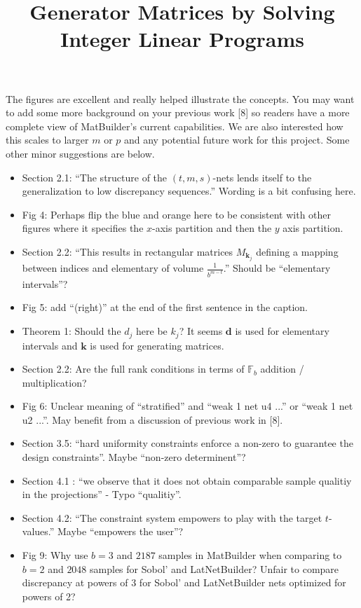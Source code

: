 \documentclass{article}[12pt]
\title{Generator Matrices by Solving Integer Linear Programs}
\date{}
\begin{document}
\maketitle

The figures are excellent and really helped illustrate the concepts. You may want to add some more background on your previous work [8] so readers have a more complete view of MatBuilder's current capabilities. We are also interested how this scales to larger $m$ or $p$ and any potential future work for this project. Some other minor suggestions are below. 

\begin{itemize}
    \item Section 2.1: ``The structure of the $(t,m,s)$-nets lends itself to the generalization to low discrepancy sequences.'' Wording is a bit confusing here. 
    \item Fig 4: Perhaps flip the blue and orange here to be consistent with other figures where it specifies the $x$-axis partition and then the $y$ axis partition. 
    \item Section 2.2: ``This results in rectangular matrices $M_{\boldsymbol{k}_j}$ defining a mapping between indices and elementary of volume $\frac{1}{b^{m-t}}$.'' Should be ``elementary intervals''? 
    \item Fig 5: add ``(right)'' at the end of the first sentence in the caption. 
    \item Theorem 1: Should the $d_j$ here be $k_j$? It seems $\boldsymbol{d}$ is used for elementary intervals and $\boldsymbol{k}$ is used for generating matrices. 
    \item Section 2.2: Are the full rank conditions in terms of $\mathbb{F}_b$ addition / multiplication? 
    \item Fig 6: Unclear meaning of ``stratified'' and ``weak 1 net u4 ...'' or ``weak 1 net u2 ...''. May benefit from a discussion of previous work in [8].
    \item Section 3.5: ``hard uniformity constraints enforce a non-zero to guarantee the design constraints''. Maybe ``non-zero determinent''?
    \item Section 4.1 : ``we observe that it does not obtain comparable sample qualitiy in the projections'' - Typo ``qualitiy''.
    \item Section 4.2: ``The constraint system empowers to play with the target $t$-values.'' Maybe ``empowers the user''?
    \item Fig 9: Why use $b=3$ and $2187$ samples in MatBuilder when comparing to $b=2$ and $2048$ samples for Sobol' and LatNetBuilder? Unfair to compare discrepancy at powers of 3 for Sobol' and LatNetBuilder nets optimized for powers of 2? 

\end{itemize}
\end{document}
